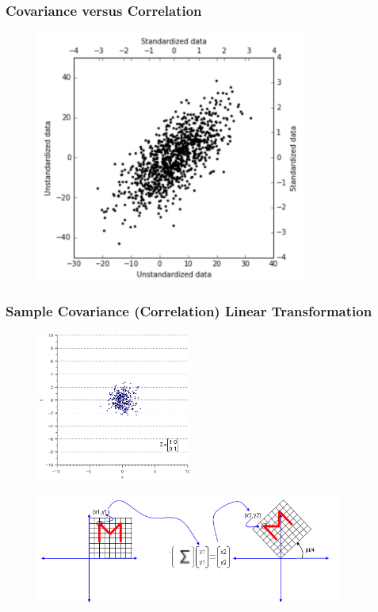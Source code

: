\documentclass[xcolor={dvipsnames}]{beamer}
\begin{document}
\frame
{
\frametitle{Covariance versus Correlation}

\begin{figure}
\centering
\includegraphics[width=3.5in]{stuff/covVcor.png}
\end{figure}

}


\frame
{
\frametitle{Sample Covariance (Correlation) Linear Transformation}

\begin{figure}
\includegraphics[width=2in]{stuff/whiteneddata.png}$\quad$

\includegraphics[width=4in]{stuff/EngMath_Matrix_Affin_Rotate.PNG}
\end{figure}




}
\end{document}
